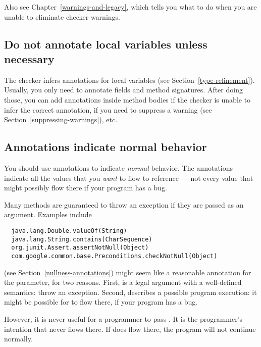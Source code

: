 Also see Chapter~\ref{warnings-and-legacy}, which tells you what to do when
you are unable to eliminate checker warnings.



\subsection{Do not annotate local variables unless necessary\label{tips-local-inference}}

The checker infers annotations for local variables (see
Section~\ref{type-refinement}).  Usually, you only need to annotate fields
and method signatures.  After doing those, you can add annotations inside
method bodies if the checker is unable to infer the correct annotation, if
you need to suppress a warning (see Section~\ref{suppressing-warnings}),
etc.


\subsection{Annotations indicate normal behavior\label{annotate-normal-behavior}}

You should use annotations to indicate \emph{normal} behavior.  The
annotations indicate all the values that you \emph{want} to flow to
reference --- not every value that might possibly flow there if your
program has a bug.

Many methods are guaranteed to throw an exception if they are passed 
as an argument.  Examples include

\begin{Verbatim}
  java.lang.Double.valueOf(String)
  java.lang.String.contains(CharSequence)
  org.junit.Assert.assertNotNull(Object)
  com.google.common.base.Preconditions.checkNotNull(Object)
\end{Verbatim}

 (see Section~\ref{nullness-annotations})
might seem like a reasonable annotation for the parameter,
for two reasons.  First,  is a legal argument with a
well-defined semantics:  throw an exception.  Second, 
describes a possible program execution:  it might be possible for
 to flow there, if your program has a bug.


However, it is never useful for a programmer to pass .  It is
the programmer's intention that  never flows there.  If
 does flow there, the program will not continue normally.


